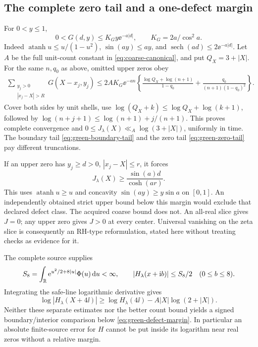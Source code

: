 \subsection{The complete zero tail and a one-defect margin}
For \(0<y\le1\),
\begin{equation}\label{eq:green-point-tail}
 0<G(d,y)\le K_Gy\ee^{-a|d|},\qquad K_G=2a/\cos^2a.
\end{equation}
Indeed \(\operatorname{atanh}u\le u/(1-u^2)\),
\(\sin(ay)\le ay\), and \(\operatorname{sech}(ad)\le2\ee^{-a|d|}\).
Let \(A\) be the full unit-count constant in
\eqref{eq:coarse-canonical}, and put \(Q_X=3+|X|\). For the same
\(n,q_0\) as above, omitted upper zeros obey
\begin{align}\label{eq:green-zero-tail}
 \sum_{\substack{y_j>0\\|x_j-X|>R}}G(X-x_j,y_j)
 \le2AK_G\ee^{-an}\left\{
 \frac{\log Q_X+\log(n+1)}{1-q_0}
 +\frac{q_0}{(n+1)(1-q_0)^2}\right\}.
\end{align}
Cover both sides by unit shells, use
\(\log(Q_X+k)\le\log Q_X+\log(k+1)\), followed by
\(\log(n+j+1)\le\log(n+1)+j/(n+1)\).
This proves complete convergence and
\(0\le J_\lambda(X)\ll_A\log(3+|X|)\), uniformly in time.
The boundary tail \eqref{eq:green-boundary-tail} and the zero tail
\eqref{eq:green-zero-tail} pay different truncations.

If an upper zero has \(y_j\ge d>0\), \(|x_j-X|\le r\), it forces
\begin{equation}\label{eq:green-defect-margin}
 J_\lambda(X)\ge\frac{\sin(a)d}{\cosh(ar)}.
\end{equation}
This uses \(\operatorname{atanh}u\ge u\) and concavity
\(\sin(ay)\ge y\sin a\) on \([0,1]\).
An independently obtained strict upper bound below this margin would
exclude that declared defect class. The acquired coarse bound does not.
An all-real slice gives \(J=0\); any upper zero gives \(J>0\) at every
center. Universal vanishing on the zeta slice is consequently an
RH-type reformulation, stated here without treating checks as evidence
for it.

The complete source supplies
\[
 S_8=\int_\mathbb R\mathrm e^{u^2/2+8|u|}\Phi(u)\,\mathrm d u<\infty,\qquad
 |H_\lambda(x+\mathrm i b)|\le S_8/2\quad(0\le b\le8).
\]
Integrating the safe-line logarithmic derivative gives
\begin{equation}\label{eq:green-safe-lower}
 \log|H_\lambda(X+4\ii)|\ge\log H_\lambda(4\ii)
                              -A|X|\log(2+|X|).
\end{equation}
Neither these separate estimates nor the better count bound yields a
signed boundary/interior comparison below \eqref{eq:green-defect-margin}.
In particular an absolute finite-source error for \(H\) cannot be put
inside its logarithm near real zeros without a relative margin.

